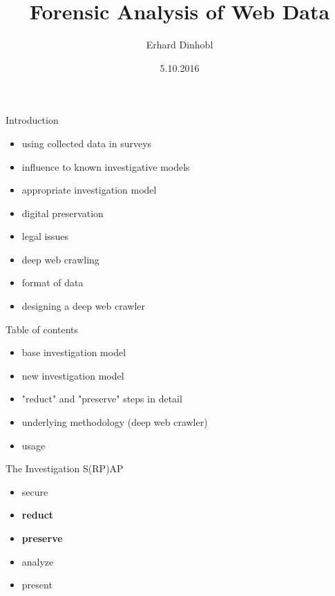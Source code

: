 \documentclass{beamer}
\title[]{Forensic Analysis of Web Data}
\author{Erhard Dinhobl}
\institute{Vienna University of Technology - Information and Software Engineering Group}
\date{5.10.2016}
\begin{document}
\begin{frame}
  \titlepage
\end{frame}


\begin{frame}{Introduction}

\begin{itemize}
  \item using collected data in surveys
  \item influence to known investigative models
  \item appropriate investigation model
  \item digital preservation
  \item legal issues
  \item deep web crawling
  \item format of data
  \item designing a deep web crawler
\end{itemize}

\end{frame}

\begin{frame}{Table of contents}

\begin{itemize}
  \item base investigation model
  \item new investigation model
  \item "reduct" and "preserve" steps in detail
  \item underlying methodology (deep web crawler)
  \item usage
\end{itemize}
\end{frame}


\begin{frame}{The Investigation S(RP)AP}
\begin{itemize}
  \item secure
  \item \textbf{reduct}
  \item \textbf{preserve}
  \item analyze
  \item present
\end{itemize}
\end{frame}
\end{document}
